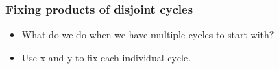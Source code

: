 \documentclass{beamer}
\begin{document}
\begin{frame}
  \frametitle{Fixing products of disjoint cycles}
  \begin{itemize}
  \item What do we do when we have multiple cycles to start with?
  \item	Use x and y to fix each individual cycle.
  \end{itemize}

\end{frame}










\end{document}
